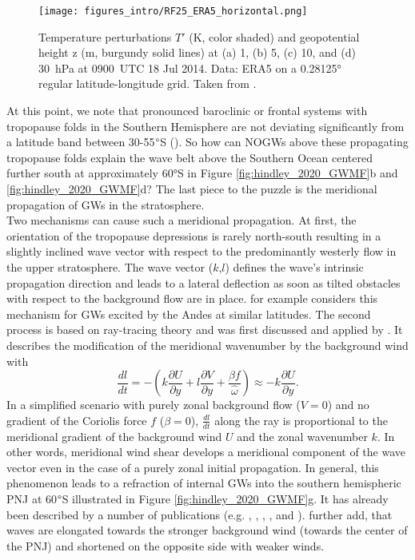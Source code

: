 \begin{figure}[t]
    \centering
    \texttt{[image: figures\_intro/RF25\_ERA5\_horizontal.png]}
    \caption{Temperature perturbations $T'$ (K, color shaded) and geopotential height z (m, burgundy solid lines) at (a) 1, (b) 5, (c) 10, and (d) \SI{30}{hPa} at \SI{0900}{UTC} 18 Jul 2014. Data: ERA5 on a 0.28125° regular latitude-longitude grid. Taken from \textcite[]{dornbrack_stratospheric_2022}.}
    \label{fig:RF25_era5_horizonal}
\end{figure} 
At this point, we note that pronounced baroclinic or frontal systems with tropopause folds in the Southern Hemisphere are not deviating significantly from a latitude band between 30-55$\degree$S (\cite{skerlak_tropopause_2015}). So how can NOGWs above these propagating tropopause folds explain the wave belt above the Southern Ocean centered further south at approximately 60°S in Figure \ref{fig:hindley_2020_GWMF}b and \ref{fig:hindley_2020_GWMF}d? The last piece to the puzzle is the meridional propagation of GWs in the stratosphere. \\
Two mechanisms can cause such a meridional propagation. At first, the orientation of the tropopause depressions is rarely north-south resulting in a slightly inclined wave vector with respect to the predominantly westerly flow in the upper stratosphere. The wave vector ($k$,$l$) defines the wave's intrinsic propagation direction and leads to a lateral deflection as soon as tilted obstacles with respect to the background flow are in place. \textcite{preusse_space-based_2002} for example considers this mechanism for GWs excited by the Andes at similar latitudes. The second process is based on ray-tracing theory and was first discussed and applied by \textcite{dunkerton_inertiagravity_1984}. It describes the modification of the meridional wavenumber by the background wind with
\begin{equation}
    \frac{dl}{dt} = -(k \frac{\partial U}{\partial y} + l \frac{\partial V}{\partial y} + \frac{\beta f}{\hat{\omega}})
    \approx -k \frac{\partial U}{\partial y}.
    \label{equ:meridionalRefraction}
\end{equation}
In a simplified scenario with purely zonal background flow ($V=0$) and no gradient of the Coriolis force $f$ ($\beta=0$), $\frac{dl}{dt}$ along the ray is proportional to the meridional gradient of the background wind $U$ and the zonal wavenumber $k$. In other words, meridional wind shear develops a meridional component of the wave vector even in the case of a purely zonal initial propagation. In general, this phenomenon leads to a refraction of internal GWs into the southern hemispheric PNJ at 60$\degree$S illustrated in Figure \ref{fig:hindley_2020_GWMF}g. It has already been described by a number of publications (e.g. \cite{dunkerton_inertiagravity_1984}, \cite{preusse_space-based_2002}, \cite{sato_origins_2009}, \cite*{sato_gravity_2012}, \cite{ehard_horizontal_2017} and \cite{jiang_stratospheric_2019}). \textcite{jiang_stratospheric_2019} further add, that waves are elongated towards the stronger background wind (towards the center of the PNJ) and shortened on the opposite side with weaker winds. \\
